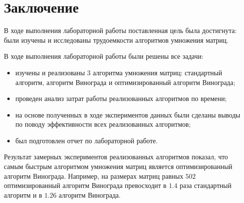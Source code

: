 \chapter*{Заключение}

В ходе выполнения лабораторной работы поставленная цель была достигнута: были изучены и исследованы трудоемкости алгоритмов умножения матриц.

В ходе выполнения лабораторной работы были решены все задачи:
\begin{itemize}
	\item изучены и реализованы 3 алгоритма умножения матриц: стандартный алгоритм, алгоритм Винограда и оптимизированный алгоритм Винограда;
	\item проведен анализ затрат работы реализованных алгоритмов по времени;
	\item на основе полученных в ходе экспериментов данных были сделаны выводы по поводу эффективности всех реализованных алгоритмов;
	\item был подготовлен отчет по лабораторной работе.
\end{itemize}

Результат замерных экспериментов реализованных алгоритмов показал, что самым быстрым алгоритмом умножения матриц является оптимизированный алгоритм Винограда. Например, на размерах матриц равных $502$ оптимизированный алгоритм Винограда превосходит в $1.4$ раза стандартный алгоритм и в $1.26$ алгоритм Винограда.
